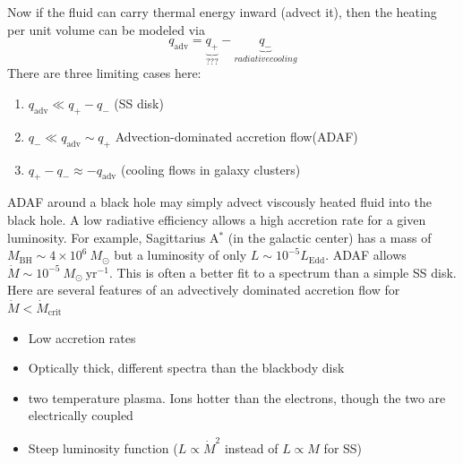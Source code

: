 \documentclass[10pt]{article}
\numberwithin{equation}{section}
\newcommand{\n}{\noindent}
\begin{document}
\n Now if the fluid can carry thermal energy inward (advect it), then the heating per unit volume can be modeled via
\begin{equation}
	\label{eq:general:1} q_{\mathrm{adv}} = \underbrace{q_+}_{???}-\underbrace{q_-}_{radiative cooling}
\end{equation}
There are three limiting cases here:
\begin{enumerate}
	\item $q_{\mathrm{adv}} \ll q_+ - q_-$ (SS disk)
	\item $q_- \ll q_{\mathrm{adv}}\sim q_+$ Advection-dominated accretion flow(ADAF)
	\item $q_+ - q_- \approx -q_{\mathrm{adv}}$ (cooling flows in galaxy clusters)
\end{enumerate}
ADAF around a black hole may simply advect viscously heated fluid into the black hole. A low radiative efficiency allows a high accretion rate for a given luminosity. For example, Sagittarius A$^*$ (in the galactic center) has a mass of $M_{\mathrm{BH}}\sim 4\times 10^6\ M_\odot$ but a luminosity of only $L\sim 10^{-5}L_{\mathrm{Edd}}$. ADAF allows $\dot{M}\sim 10^{-5}\ M_\odot\ \mathrm{yr^{-1}}$. This is often a better fit to a spectrum than a simple SS disk.\\

\n Here are several features of an advectively dominated accretion flow for $\dot{M}<\dot{M}_{\mathrm{crit}}$
\begin{itemize}
	\item Low accretion rates
	\item Optically thick, different spectra than the blackbody disk
	\item two temperature plasma. Ions hotter than the electrons, though the two are electrically coupled
	\item Steep luminosity function ($L\propto \dot{M}^2$ instead of $L\propto M$ for SS)
\end{itemize}
\end{document}
